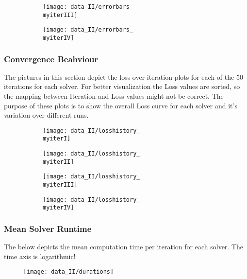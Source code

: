 \begin{figure}[h]
	\begin{subfigure}{0.5\textwidth}
		\texttt{[image: data\_II/errorbars\_\\myiterIII]}
		\label{fig:errorbars_\myiterIII_II}
	\end{subfigure}
	\begin{subfigure}{0.5\textwidth}
		\texttt{[image: data\_II/errorbars\_\\myiterIV]}
		\label{fig:errorbars_\myiterIV_II}
	\end{subfigure}
\end{figure}


\newpage


\subsubsection{Convergence Beahviour}

The pictures in this section depict the loss over iteration plots for each of the 50 iterations for each solver. For better visualization the Loss values are sorted, so the mapping between Iteration and Loss values might not be correct. The purpose of these plots is to show the overall Loss curve for each solver and it's variation over different runs.  

\begin{figure}[h]
	\begin{subfigure}{0.5\textwidth}
		\texttt{[image: data\_II/losshistory\_\\myiterI]}
		\label{fig:losshistory_\myiterI_II}
	\end{subfigure}
	\begin{subfigure}{0.5\textwidth}
		\texttt{[image: data\_II/losshistory\_\\myiterII]}
		\label{fig:losshistory_\myiterII_II}
	\end{subfigure}
\end{figure}

\begin{figure}[h]
	\begin{subfigure}{0.5\textwidth}
		\texttt{[image: data\_II/losshistory\_\\myiterIII]}
		\label{fig:losshistory_\myiterIII_II}
	\end{subfigure}
	\begin{subfigure}{0.5\textwidth}
		\texttt{[image: data\_II/losshistory\_\\myiterIV]}
		\label{fig:losshistory_\myiterIV_II}
	\end{subfigure}
\end{figure}


\newpage


\subsubsection{Mean Solver Runtime}

The below depicts the mean computation time per iteration for each solver. The time axis is logarithmic!  

\begin{figure}[h]
		\texttt{[image: data\_II/durations]}
		\label{fig:duration_II}
\end{figure}
